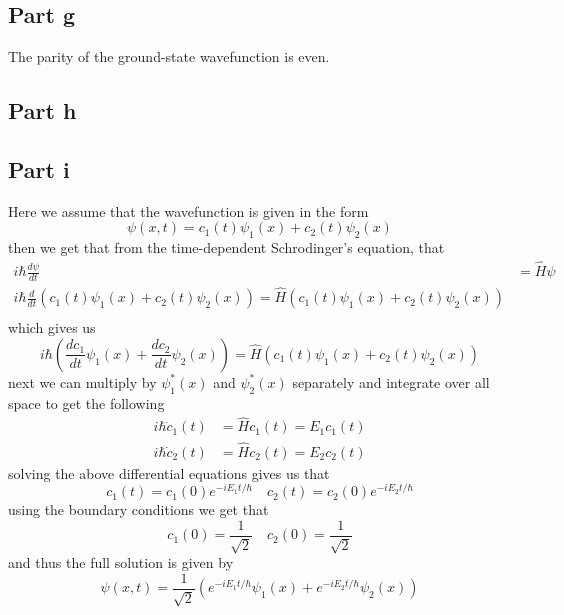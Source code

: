 \documentclass[12pt]{report}
\begin{document}
\subsection*{Part g}
The parity of the ground-state wavefunction is even.

\subsection*{Part h}

\subsection*{Part i}
Here we assume that the wavefunction is given in the form
\begin{equation*}
  \psi(x,t) = c_1(t) \psi_1(x) + c_2(t) \psi_2(x)
\end{equation*}
then we get that from the time-dependent Schrodinger's equation, that
\begin{align*}
  i\hbar \frac{d\psi}{dt} &= \hat{H}\psi \\
  i\hbar \frac{d}{dt} (c_1(t) \psi_1(x) + c_2(t)\psi_2(x)) = \hat{H}(c_1(t) \psi_1(x) + c_2(t)\psi_2(x)) \\
\end{align*}
which gives us
\begin{equation*}
  i\hbar \left(\frac{dc_1}{dt}\psi_1(x) + \frac{dc_2}{dt}\psi_2(x) \right) = \hat{H}(c_1(t) \psi_1(x) + c_2(t)\psi_2(x))
\end{equation*}
next we can multiply by $\psi_1^*(x)$ and $\psi_2^*(x)$ separately and integrate over all space to get the following
\begin{align*}
  i\hbar \dot{c}_1(t) &= \hat{H}c_1(t) = E_1c_1(t) \\
  i\hbar \dot{c}_2(t) &= \hat{H}c_2(t) = E_2c_2(t)
\end{align*}
solving the above differential equations gives us that
\begin{equation*}
  c_1(t) = c_1(0)e^{-iE_1t/\hbar} \quad c_2(t) = c_2(0)e^{-iE_2t/\hbar}
\end{equation*}
using the boundary conditions we get that
\begin{equation*}
  c_1(0) = \frac{1}{\sqrt{2}} \quad c_2(0) = \frac{1}{\sqrt{2}}
\end{equation*}
and thus the full solution is given by
\begin{equation*}
  \psi(x,t) = \frac{1}{\sqrt{2}}\left(e^{-iE_1t/\hbar}\psi_1(x) + e^{-iE_2t/\hbar}\psi_2(x)\right)
\end{equation*}
\end{document}
